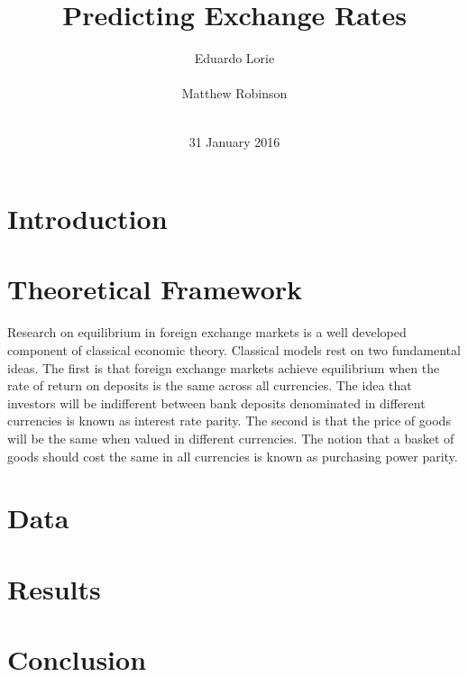 \documentclass{sig-alternate-05-2015}
\begin{document}


\title{{Predicting Exchange Rates}
}
\author{
\alignauthor
Eduardo Lorie\\
       \\
\alignauthor 
Matthew Robinson \\
       \\
}

\date{31 January 2016}

\maketitle

\section{Introduction}

\section{Theoretical Framework}
Research on equilibrium in foreign exchange markets is a well developed component of classical economic theory. Classical models rest on two fundamental ideas. The first is that foreign exchange markets achieve equilibrium when the rate of return on deposits is the same across all currencies. The idea that investors will be indifferent between bank deposits denominated in different currencies is known as interest rate parity. The second is that the price of goods will be the same when valued in different currencies. The notion that a basket of goods should cost the same in all currencies is known as purchasing power parity.
\par{} 

\section{Data}

\section{Results}

\section{Conclusion}
     
\end{document}
